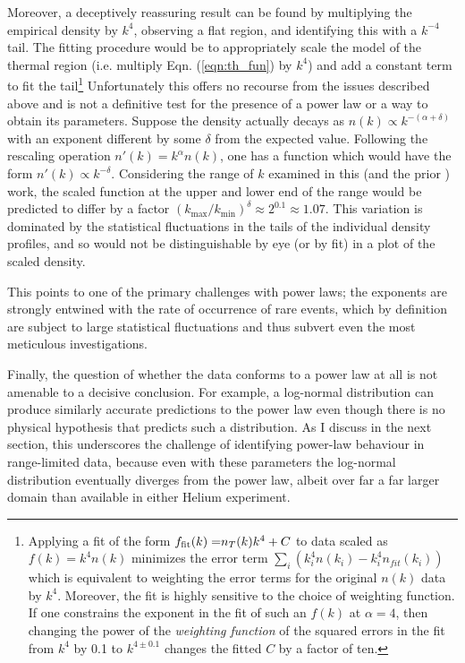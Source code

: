 	Moreover, a deceptively reassuring result can be found by multiplying the empirical density by $k^4$, observing a flat region, and identifying this with {a $k^{-4}$ tail.} %
	The fitting procedure would be to appropriately scale the model of the thermal region (i.e. multiply Eqn. (\ref{eqn:th_fun}) by $k^4$) and add a constant term to fit the tail\footnote{Applying a fit of the form ${f_{\rm fit}(k)=}n_T(k)k^4+C$ to data scaled as ${f(k)} = k^4 n(k)$ minimizes the error term $\sum_i (k_{i}^{4}n(k_i)-k_{i}^4n_{fit}(k_i))$ which is equivalent to weighting the error terms {for the original $n(k)$ data} by $k^4$. 
	Moreover, the fit is highly sensitive to the choice of weighting function.
	If one constrains the exponent in the fit {of such an $f(k)$} at $\alpha=4$, then changing the {power of the} \emph{weighting function} of the squared errors in the fit from {$k^4$} by 0.1 {to $k^{4\pm0.1}$} changes the fitted {$C$} %
	by a factor of ten.}
	Unfortunately this offers no recourse from the issues described above and is not a definitive test for the presence of a power law or a way to obtain its parameters.
	Suppose the density actually decays as $n(k) \propto k^{-(\alpha+\delta)}$ with an exponent different by some $\delta$ from the expected value.
	Following the rescaling operation $n'(k) = k^\alpha n(k)$, one has a {function} %
	which would have the form $n'(k) \propto k^{-\delta}$. 
	Considering the range of $k$ examined in this (and the prior \cite{Chang16}) work, the scaled {function} %
	at the upper and lower end of the range would be predicted to differ by a factor $(k_\textrm{max}/k_\textrm{min})^\delta \approx 2^{0.1}\approx1.07$.
	This variation is dominated by the statistical fluctuations in the tails of the individual density profiles, and so would not be distinguishable by eye (or by fit) in a plot of the scaled density.
	
	This points to one of the primary challenges with power laws; the exponents are strongly entwined with the rate of occurrence of rare events, which by definition are subject to large statistical fluctuations and thus subvert even the most meticulous investigations.

	{Finally, the question of whether the data conforms to a power law at all is not amenable to a decisive conclusion. 
	For example, a log-normal distribution can produce similarly accurate predictions to the power law \cite{Virkar14,Clauset09} even though there is no physical hypothesis that predicts such a distribution. 
	As I discuss in the next section, this underscores the challenge of identifying power-law behaviour in range-limited data, because even with these parameters the log-normal distribution eventually diverges from the power law, albeit over far a far larger domain than available in either Helium experiment.}

